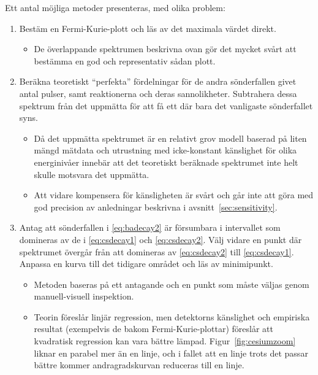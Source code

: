 Ett antal möjliga metoder presenteras, med olika problem:
%
\begin{enumerate}
    \item Bestäm en Fermi-Kurie-plott och läs av det maximala värdet direkt.
    \begin{itemize}
        \item De överlappande spektrumen beskrivna ovan gör det mycket svårt
        att bestämma en god och representativ sådan plott.
    \end{itemize}

    \item Beräkna teoretiskt ``perfekta'' fördelningar för de andra
    sönderfallen givet antal pulser, samt reaktionerna och deras sannolikheter.
    Subtrahera dessa spektrum från det uppmätta för att få ett där bara det
    vanligaste sönderfallet syns.
    \begin{itemize}
        \item Då det uppmätta spektrumet är en relativt grov modell baserad på
        liten mängd mätdata och utrustning med icke-konstant känslighet för
        olika energinivåer innebär att det teoretiskt beräknade spektrumet inte
        helt skulle motsvara det uppmätta.

        \item Att vidare kompensera för känsligheten är svårt och går inte att
        göra med god precision av anledningar beskrivna i
        avsnitt~\ref{sec:sensitivity}.
    \end{itemize}

    \item Antag att sönderfallen i \eqref{eq:badecay2} är försumbara i
    intervallet som domineras av de i \eqref{eq:csdecay1} och
    \eqref{eq:csdecay2}. Välj vidare en punkt där spektrumet övergår från att
    domineras av \eqref{eq:csdecay2} till \eqref{eq:csdecay1}. Anpassa en kurva
    till det tidigare området och läs av minimipunkt.
    \begin{itemize}
        \item Metoden baseras på ett antagande och en punkt som måste väljas
        genom manuell-visuell inspektion.

        \item Teorin föreslår linjär regression, men detektorns känslighet och
        empiriska resultat (exempelvis de bakom Fermi-Kurie-plottar) föreslår
        att kvadratisk regression kan vara bättre lämpad.
        Figur~\ref{fig:cesiumzoom} liknar en parabel mer än en linje, och i
        fallet att en linje trots det passar bättre kommer andragradskurvan
        reduceras till en linje.
    \end{itemize}
\end{enumerate}

